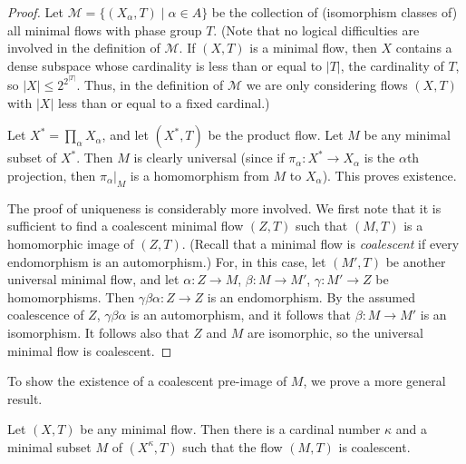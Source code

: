 \begin{proof}
    Let $\mathcal{M} = \{(X_\alpha,T)\mid \alpha \in A\}$ be the collection of (isomorphism classes of) all minimal flows with phase group $T$.
    (Note that no logical difficulties are involved in the definition of $\mathcal{M}$. If $(X,T)$ is a minimal flow, then $X$ contains a dense subspace whose cardinality is less than or equal to $|T|$, the cardinality of $T$, so $|X| \le 2^{2^{|T|}}$. Thus, in the definition of $\mathcal{M}$ we are only considering flows $(X,T)$ with $|X|$ less than or equal to a fixed cardinal.)

    Let $X^* = \prod_{\alpha} X_\alpha$, and let $(X^*,T)$ be the product flow.
    Let $M$ be any minimal subset of $X^*$. Then $M$ is clearly universal (since if $\pi_\alpha : X^* \to X_\alpha$ is the $\alpha$th projection, then $\pi_\alpha|_M$ is a homomorphism from $M$ to $X_\alpha$). This proves existence.

    The proof of uniqueness is considerably more involved. We first note that it is sufficient to find a coalescent minimal flow $(Z,T)$ such that $(M,T)$ is a homomorphic image of $(Z,T)$. (Recall that a minimal flow is \emph{coalescent} if every endomorphism is an automorphism.) For, in this case, let $(M',T)$ be another universal minimal flow, and let $\alpha : Z \to M$, $\beta : M \to M'$, $\gamma : M' \to Z$ be homomorphisms. Then $\gamma \beta \alpha : Z \to Z$ is an endomorphism. By the assumed coalescence of $Z$, $\gamma \beta \alpha$ is an automorphism, and it follows that $\beta : M \to M'$ is an isomorphism. It follows also that $Z$ and $M$ are isomorphic, so the universal minimal flow is coalescent.
\end{proof}


To show the existence of a coalescent pre-image of $M$, we prove a more general result.


\begin{lemma}
    \label{lem:coalescent_extension_minimal_flow}
    Let $(X,T)$ be any minimal flow. Then there is a cardinal number $\kappa$ and a minimal subset $M$ of $(X^\kappa,T)$ such that the flow $(M,T)$ is coalescent.
\end{lemma}



